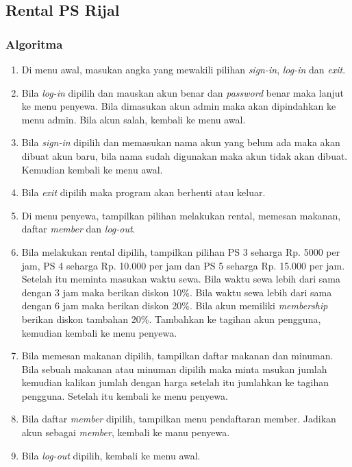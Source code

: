 \documentclass[../main.tex]{subfiles}
\begin{document}
    \subsection{Rental PS Rijal}
    \subsubsection{Algoritma}
    {\renewcommand{\labelenumi}{\alph{enumi}.}
        \begin{enumerate}[leftmargin=1.56cm]
            \item Di menu awal, masukan angka yang mewakili pilihan \textit{sign-in}, \textit{log-in} dan \textit{exit}.
            \item {Bila \textit{log-in} dipilih dan mauskan akun benar dan \textit{password} benar maka lanjut ke menu penyewa. Bila dimasukan akun admin maka akan dipindahkan ke menu admin. Bila akun salah, kembali ke menu awal.}
            \item {Bila \textit{sign-in} dipilih dan memasukan nama akun yang belum ada maka akan dibuat akun baru, bila nama sudah digunakan maka akun tidak akan dibuat. Kemudian kembali ke menu awal.}
            \item{Bila \textit{exit} dipilih maka program akan berhenti atau keluar.}
            \item{Di menu penyewa, tampilkan pilihan melakukan rental, memesan makanan, daftar \textit{member} dan \textit{log-out}.}
            \item{Bila melakukan rental dipilih, tampilkan pilihan PS 3 seharga Rp. 5000 per jam, PS 4 seharga Rp. 10.000 per jam dan PS 5 seharga Rp. 15.000 per jam. Setelah itu meminta masukan waktu sewa. Bila waktu sewa lebih dari sama dengan 3 jam maka berikan diskon 10\%. Bila waktu sewa lebih dari sama dengan 6 jam maka berikan diskon 20\%. Bila akun memiliki \textit{membership} berikan diskon tambahan 20\%. Tambahkan ke tagihan akun pengguna, kemudian kembali ke menu penyewa.}
            \item{Bila memesan makanan dipilih, tampilkan daftar makanan dan minuman. Bila sebuah makanan atau minuman dipilih maka minta msukan jumlah kemudian kalikan jumlah dengan harga setelah itu jumlahkan ke tagihan pengguna. Setelah itu kembali ke menu penyewa.}
            \item{Bila daftar \textit{member} dipilih, tampilkan menu pendaftaran member. Jadikan akun sebagai \textit{member}, kembali ke manu penyewa.}
            \item{Bila \textit{log-out} dipilih, kembali ke menu awal.}

\end{enumerate}}
\end{document}
